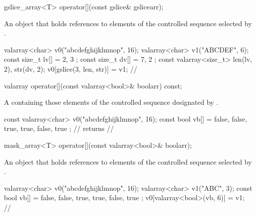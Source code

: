 %
\begin{itemdecl}
gslice_array<T> operator[](const gslice& gslicearr);
\end{itemdecl}

\begin{itemdescr}
\pnum
\returns
An object that holds references to elements of the controlled
sequence selected by .
\begin{example}
\begin{codeblock}
valarray<char> v0("abcdefghijklmnop", 16);
valarray<char> v1("ABCDEF", 6);
const size_t lv[] = { 2, 3 };
const size_t dv[] = { 7, 2 };
const valarray<size_t> len(lv, 2), str(dv, 2);
v0[gslice(3, len, str)] = v1;
// 
\end{codeblock}
\end{example}
\end{itemdescr}

%
\begin{itemdecl}
valarray operator[](const valarray<bool>& boolarr) const;
\end{itemdecl}

\begin{itemdescr}
\pnum
\returns
A  containing those
elements of the controlled sequence designated by .
\begin{example}
\begin{codeblock}
const valarray<char> v0("abcdefghijklmnop", 16);
const bool vb[] = { false, false, true, true, false, true };
//  returns
// 
\end{codeblock}
\end{example}
\end{itemdescr}

%
\begin{itemdecl}
mask_array<T> operator[](const valarray<bool>& boolarr);
\end{itemdecl}

\begin{itemdescr}
\pnum
\returns
An object that holds references to elements of the controlled
sequence selected by .
\begin{example}
\begin{codeblock}
valarray<char> v0("abcdefghijklmnop", 16);
valarray<char> v1("ABC", 3);
const bool vb[] = { false, false, true, true, false, true };
v0[valarray<bool>(vb, 6)] = v1;
// 
\end{codeblock}
\end{example}
\end{itemdescr}


